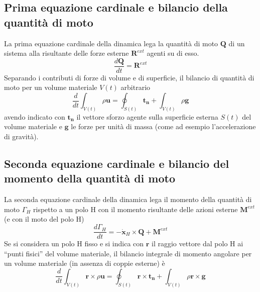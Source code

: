 \subsection{Prima equazione cardinale e bilancio della quantità di moto}
La prima equazione cardinale della dinamica lega la quantità di moto $\bm{Q}$ di un sistema alla risultante delle forze esterne $\bm{R}^{ext}$
 agenti su di esso.
\begin{equation}
 \dfrac{d\bm{Q}}{d t} = \bm{R}^{ext}
\end{equation}
Separando i contributi di forze di volume e di superficie, il bilancio di quantità di moto per un volume materiale $V(t)$ arbitrario
\begin{equation}
 \dfrac{d}{d t} \int_{V(t)} \rho \bm{u} = \oint_{S(t)} \bm{t_n} + \int_{V(t)} \rho \bm{g}
\end{equation}
avendo indicato con $\bm{t_n}$ il vettore sforzo agente sulla superficie esterna $S(t)$ del volume materiale e $\bm{g}$ le forze per unità di
 massa (come ad esempio l'accelerazione di gravità).

\subsection{Seconda equazione cardinale e bilancio del momento della quantità di moto}
La seconda equazione cardinale della dinamica lega il momento della quantità di moto ${\Gamma}_H$ rispetto a un polo H con il momento risultante
 delle azioni esterne $\bm{M}^{ext}$ (e con il moto del polo H)
\begin{equation}
 \dfrac{d {\Gamma}_H}{dt} = -\dot{\bm{x}}_H \times \bm{Q} + \bm{M}^{ext}
\end{equation}
Se si considera un polo H fisso e si indica con $\bm{r}$ il raggio vettore dal polo H ai ``punti fisici'' del volume materiale,
 il bilancio integrale di momento angolare per un volume materiale (in assenza di coppie esterne) è
\begin{equation}
 \dfrac{d}{d t} \int_{V(t)} \bm{r} \times \rho \bm{u} = \oint_{S(t)} \bm{r} \times \bm{t_n} + \int_{V(t)} \rho \bm{r} \times \bm{g}
\end{equation}

